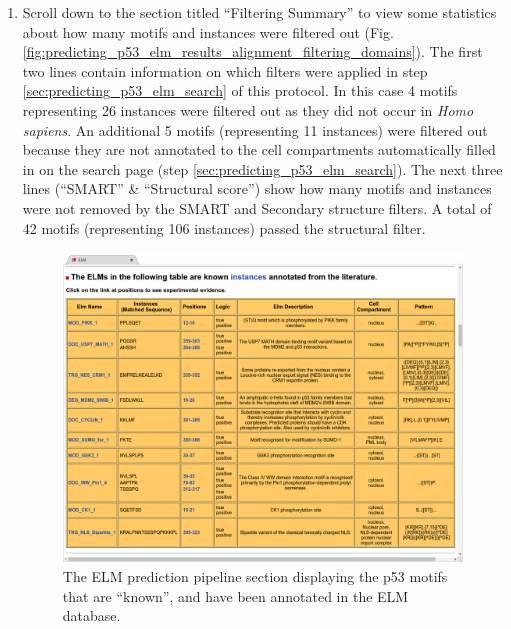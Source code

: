 \documentclass[12pt]{article}
\newcounter{proto}
\begin{document}
\begin{enumerate}
	\item Scroll down to the section titled ``Filtering Summary'' to view some
		statistics about how many motifs and instances were filtered out
		(Fig.
		\ref{fig:predicting_p53_elm_results_alignment_filtering_domains}).
		The first two lines contain information on 
		which filters were applied in step \ref{sec:predicting_p53_elm_search} of this protocol.
		In this case 4 motifs representing 26 instances were filtered
		out as they did not occur in \textit{Homo sapiens}. An additional 5
		motifs (representing 11 instances) were filtered out because they are
		not annotated to the cell compartments automatically filled in on the
		search page (step \ref{sec:predicting_p53_elm_search}).
		The next three lines (``SMART'' \& ``Structural score'') show how many
		motifs and instances were not removed by the SMART and Secondary
		structure filters. A total of 42 motifs (representing 106 instances)
		passed the structural filter.


	\begin{figure}[h!]
		\centering
		\includegraphics[width=\textwidth]{Figures/predicting_p53/elm_results_known.png}
		\caption{
			The ELM prediction pipeline section displaying the p53 motifs
			that are ``known'', and have been annotated in the ELM
			database.
		}
		\label{fig:predicting_p53_elm_results_known}
	\end{figure}


\end{enumerate}
\end{document}
